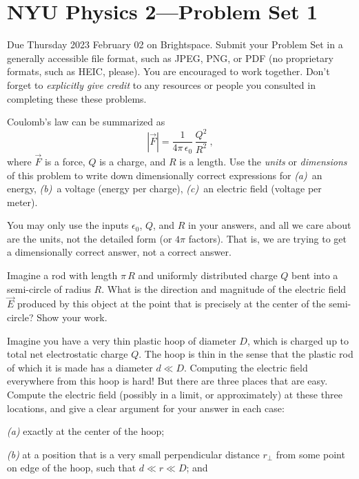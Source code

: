 \documentclass[12pt]{article}
\begin{document}
\section*{NYU Physics 2---Problem Set 1}

Due Thursday 2023 February 02 on Brightspace.
Submit your Problem Set in a generally accessible file format, such as JPEG, PNG, or PDF
(no proprietary formats, such as HEIC, please).
You are encouraged to work together.
Don't forget to \emph{explicitly give credit} to any resources or people
you consulted in completing these these problems.

\startproblem%
Coulomb's law can be summarized as
\begin{equation}
  |\vec{F}| = \frac{1}{4\pi\,\epsilon_0}\,\frac{Q^2}{R^2}~,
\end{equation}
where $\vec{F}$ is a force, $Q$ is a charge, and $R$ is a length.
Use the \emph{units} or \emph{dimensions} of this problem to write
down dimensionally correct expressions for
\textsl{(a)}~an energy,
\textsl{(b)}~a voltage (energy per charge),
\textsl{(c)}~an electric field (voltage per meter).

You may only use the inputs $\epsilon_0$, $Q$, and $R$ in your answers, and all
we care about are the units, not the detailed form (or $4\pi$ factors).
That is, we are trying to get a dimensionally correct answer, not a correct answer.

\startproblem%
Imagine a rod with length $\pi\,R$ and uniformly distributed charge
$Q$ bent into a semi-circle of radius $R$.  What is the direction and
magnitude of the electric field $\vec{E}$ produced by this object
at the point that is precisely at the center of the semi-circle?
Show your work.

\startproblem%
Imagine you have a very thin plastic hoop of diameter $D$, which is
charged up to total net electrostatic charge $Q$.
The hoop is thin in the sense that the plastic rod of which it is
made has a diameter $d\ll D$.
Computing the electric field everywhere from this hoop is hard!
But there are three places that are easy.
Compute the electric field (possibly in a limit, or approximately)
at these three locations, and give a clear argument for your answer
in each case:

\textsl{(a)} exactly at the center of the hoop;

\textsl{(b)} at a position that is a very small perpendicular
distance $r_\perp$ from some point on edge of the hoop,
such that $d\ll r\ll D$; and
\end{document}
